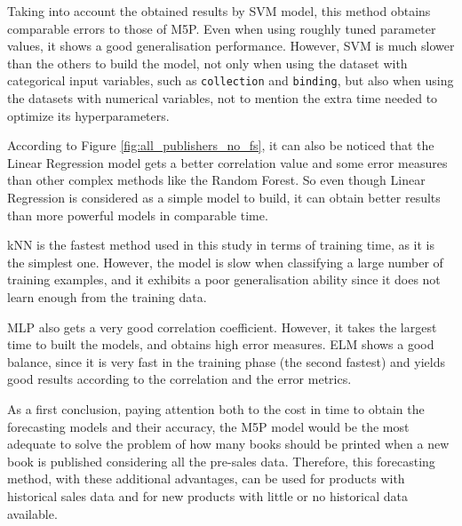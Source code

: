 \documentclass[a4paper,10pt,twocolumn,preprint,3p]{elsarticle}
\begin{document}
Taking into account the obtained results by SVM model, this method obtains comparable errors to those of M5P. Even when using roughly tuned parameter values, it shows a good generalisation performance. However, SVM is much slower than the others to build the model, not only when using the dataset with categorical input variables, such as \texttt{collection} and \texttt{binding}, but also when using the datasets with numerical variables, not to mention the extra time needed to optimize its hyperparameters.

According to Figure \ref{fig:all_publishers_no_fs}, it can also be noticed that 
the Linear Regression model gets a better correlation value and some error measures than other complex methods like the Random Forest. 
So even though Linear Regression is considered as a simple model to build, it can obtain better results than more powerful models in comparable time.

kNN is the fastest method used in this study in terms of training time, as it 
is the simplest one. However, the model is slow when classifying a large number of 
training examples, and it exhibits a poor generalisation ability since it does 
not learn enough from the training data.


MLP also gets a very good correlation coefficient. However, it takes the largest time to built the models, and obtains high error measures. ELM shows a good balance, since it is very fast in the training phase (the second fastest) and yields good results according to the correlation and the error metrics.

As a first conclusion, paying attention both to the cost in time to obtain the 
forecasting models and their accuracy, the M5P model would be the most adequate 
to solve the problem of how many books should be printed when a new book is 
published considering all the pre-sales data. Therefore, this forecasting method, with these additional advantages, can be used for products with historical sales data and for new products with little or no historical data available.
\end{document}
